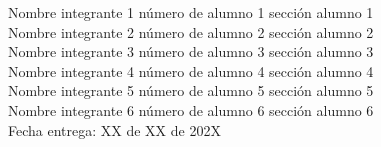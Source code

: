 \documentclass[letterpaper]{article}
\begin{document}
\vspace*{30mm}
\flushright 
	
Nombre integrante 1	número de alumno 1 sección alumno 1 \\
Nombre integrante 2	número de alumno 2 sección alumno 2\\
Nombre integrante 3	número de alumno 3 sección alumno 3\\
Nombre integrante 4	número de alumno 4 sección alumno 4\\
Nombre integrante 5	número de alumno 5 sección alumno 5\\
Nombre integrante 6 número de alumno 6 sección alumno 6\\

 
\vspace*{5mm}
{\large Fecha entrega: XX de XX de 202X\\}
\end{document}
